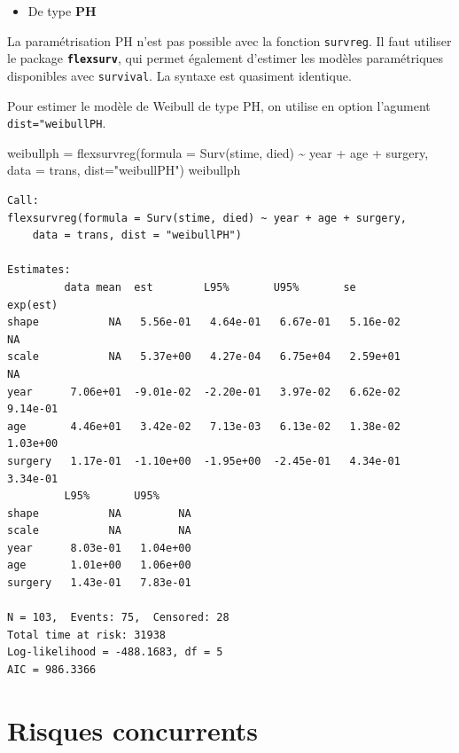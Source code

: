 \documentclass[
  12pt,
  letterpaper,
  DIV=11,
  numbers=noendperiod,
  onepage,
  openany]{scrreprt}
\newenvironment{Shaded}{\begin{snugshade}}{\end{snugshade}}
\newcommand{\AttributeTok}[1]{\textcolor[rgb]{0.80,0.80,0.80}{#1}}
\newcommand{\FunctionTok}[1]{\textcolor[rgb]{0.94,0.94,0.56}{#1}}
\newcommand{\NormalTok}[1]{\textcolor[rgb]{0.80,0.80,0.80}{#1}}
\newcommand{\OtherTok}[1]{\textcolor[rgb]{0.94,0.94,0.56}{#1}}
\newcommand{\SpecialCharTok}[1]{\textcolor[rgb]{0.86,0.64,0.64}{#1}}
\newcommand{\StringTok}[1]{\textcolor[rgb]{0.80,0.58,0.58}{#1}}
\providecommand{\tightlist}{%
  \setlength{\itemsep}{0pt}\setlength{\parskip}{0pt}}\usepackage{longtable,booktabs,array}
\begin{document}
\begin{itemize}
\tightlist
\item
  De type \textbf{PH}
\end{itemize}

La paramétrisation PH n'est pas possible avec la fonction
\texttt{survreg}. Il faut utiliser le package
\textbf{\texttt{flexsurv}}, qui permet également d'estimer les modèles
paramétriques disponibles avec \texttt{survival}. La syntaxe est
quasiment identique.

Pour estimer le modèle de Weibull de type PH, on utilise en option
l'agument \texttt{dist="weibullPH}.

\begin{Shaded}
\begin{Highlighting}[]
\NormalTok{weibullph }\OtherTok{=} \FunctionTok{flexsurvreg}\NormalTok{(}\AttributeTok{formula =} \FunctionTok{Surv}\NormalTok{(stime, died) }\SpecialCharTok{\textasciitilde{}}\NormalTok{ year }\SpecialCharTok{+}\NormalTok{ age }\SpecialCharTok{+}\NormalTok{ surgery, }\AttributeTok{data =}\NormalTok{ trans, }\AttributeTok{dist=}\StringTok{"weibullPH"}\NormalTok{)}
\NormalTok{weibullph}
\end{Highlighting}
\end{Shaded}

\begin{verbatim}
Call:
flexsurvreg(formula = Surv(stime, died) ~ year + age + surgery, 
    data = trans, dist = "weibullPH")

Estimates: 
         data mean  est        L95%       U95%       se         exp(est) 
shape           NA   5.56e-01   4.64e-01   6.67e-01   5.16e-02         NA
scale           NA   5.37e+00   4.27e-04   6.75e+04   2.59e+01         NA
year      7.06e+01  -9.01e-02  -2.20e-01   3.97e-02   6.62e-02   9.14e-01
age       4.46e+01   3.42e-02   7.13e-03   6.13e-02   1.38e-02   1.03e+00
surgery   1.17e-01  -1.10e+00  -1.95e+00  -2.45e-01   4.34e-01   3.34e-01
         L95%       U95%     
shape           NA         NA
scale           NA         NA
year      8.03e-01   1.04e+00
age       1.01e+00   1.06e+00
surgery   1.43e-01   7.83e-01

N = 103,  Events: 75,  Censored: 28
Total time at risk: 31938
Log-likelihood = -488.1683, df = 5
AIC = 986.3366
\end{verbatim}

\hypertarget{risques-concurrents-1}{%
\section{Risques concurrents}\label{risques-concurrents-1}}
\end{document}
